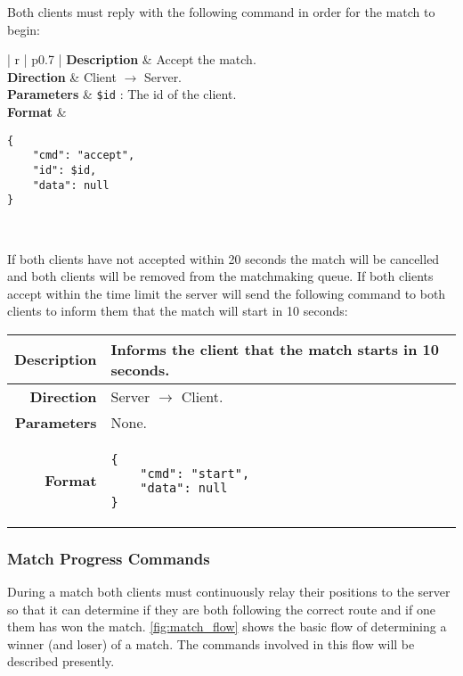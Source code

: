 Both clients must reply with the following command in order for the match to begin:

\begin{center}
	\begin{tabular}{| r | p{} |}
		\hline
		\textbf{Description} & Accept the match. \\ \hline
		\textbf{Direction} & Client $\rightarrow$ Server. \\ \hline
		\textbf{Parameters} & \texttt{\$id} : The id of the client. \\ \hline
		\textbf{Format} &
\begin{lstlisting}[language=Command]
{
	"cmd": "accept",
	"id": $id,
	"data": null
}
\end{lstlisting}
		\\ \hline
	\end{tabular}
\end{center}

If both clients have not accepted within 20 seconds the match will be cancelled and both clients will be removed from the matchmaking queue.
If both clients accept within the time limit the server will send the following command to both clients to inform them that the match will start in 10 seconds:

\begin{center}
	\begin{tabular}{| r | p{} |}
		\hline
		\textbf{Description} & Informs the client that the match starts in 10 seconds. \\ \hline
		\textbf{Direction} & Server $\rightarrow$ Client. \\ \hline
		\textbf{Parameters} & None. \\ \hline
		\textbf{Format} &
\begin{lstlisting}[language=Command]
{
	"cmd": "start",
	"data": null
}
\end{lstlisting}
		\\ \hline
	\end{tabular}
\end{center}

\subsubsection{Match Progress Commands}
During a match both clients must continuously relay their positions to the server so that it can determine if they are both following the correct route and if one them has won the match.
\autoref{fig:match_flow} shows the basic flow of determining a winner (and loser) of a match.
The commands involved in this flow will be described presently.

